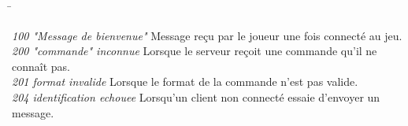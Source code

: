 \par

\begin{tabbing}
	\hspace{5cm}\=\kill

	\textit{100 "Message de bienvenue"} \>
	Message reçu par le joueur une fois connecté au jeu. \\

	\textit{200 "commande" inconnue} \>
	Lorsque le serveur reçoit une commande qu'il ne connaît pas. \\

	\textit{201 format invalide} \>
	Lorsque le format de la commande n'est pas valide. \\

	\textit{204 identification echouee} \>
	Lorsqu'un client non connecté essaie d'envoyer un message.\\

\end{tabbing}